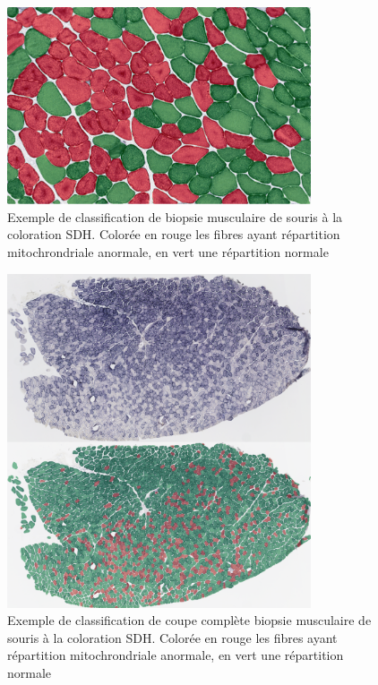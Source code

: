\begin{figure}[htbp]
 \centering
 \includegraphics[width=0.8\textwidth]{figures/sdh_paint.png}
 \caption[Exemple de classification de biopsie musculaire de souris à la coloration SDH]{Exemple de classification de biopsie musculaire de souris à la coloration SDH. Colorée en rouge les fibres ayant répartition mitochrondriale anormale, en vert une répartition normale}
 \label{fig:sdh_paint}
\end{figure}
\begin{figure}[htbp]
 \centering
 \includegraphics[width=0.8\textwidth]{figures/wsi_sdh.png}
 \caption[Exemple de classification de coupe complète biopsie musculaire de souris à la coloration SDH]{Exemple de classification de coupe complète biopsie musculaire de souris à la coloration SDH. Colorée en rouge les fibres ayant répartition mitochrondriale anormale, en vert une répartition normale}
 \label{fig:sdh_wsi_paint}
\end{figure}

